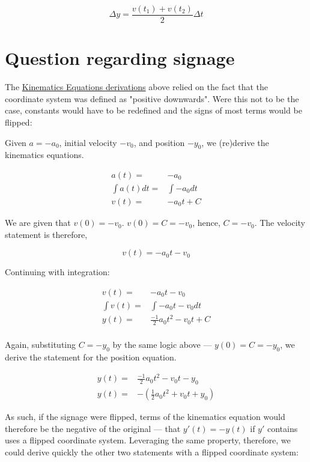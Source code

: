 \documentclass[letterpaper]{article}
\begin{document}
\begin{equation}
    \Delta y = \frac{v(t_1)+v(t_2)}{2}\Delta t
\end{equation}

\section{Question regarding signage}
\label{sec:orgced5d3c}
The \hyperref[sec:org3c9e371]{Kinematics Equations derivations} above relied on the fact that the coordinate system was defined as "positive downwards". Were this not to be the case, constants would have to be redefined and the signs of most terms would be flipped:

Given \(a=-a_0\), initial velocity \(-v_0\), and position \(-y_0\), we (re)derive the kinematics equations.

\begin{align}
    a(t) =& -a_0 \\
    \int a(t) dt =& \int -a_0 dt \\
    v(t) =& -a_0t + C 
\end{align}

We are given that \(v(0)=-v_0\). \(v(0) = C = -v_0\), hence, \(C=-v_0\). The velocity statement is therefore,

\begin{equation}
    v(t) = -a_0t-v_0
\end{equation}

Continuing with integration:

\begin{align}
    v(t) =& -a_0t - v_0 \\
    \int v(t) =& \int -a_0t - v_0 dt \\
    y(t) =& \frac{-1}{2}a_0t^2 - v_0t+C \\
\end{align}

Again, substituting \(C = -y_0\) by the same logic above --- \(y(0) = C = -y_0\), we derive the statement for the position equation.

\begin{align}
    y(t) =& \frac{-1}{2}a_0t^2 - v_0t - y_0 \\
    y(t) =& -(\frac{1}{2}a_0t^2 + v_0t + y_0)
\end{align}

As such, if the signage were flipped, terms of the kinematics equation would therefore be the negative of the original --- that \(y'(t) = -y(t)\) if \(y'\) contains uses a flipped coordinate system. Leveraging the same property, therefore, we could derive quickly the other two statements with a flipped coordinate system:
\end{document}
